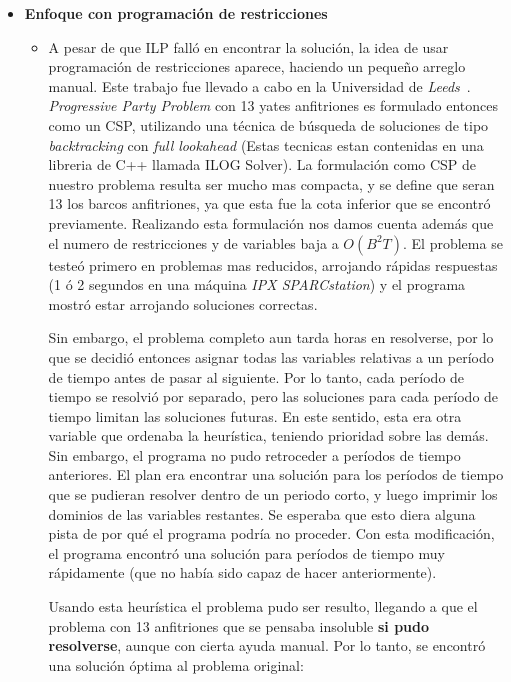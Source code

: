 \documentclass[letter, 10pt]{article}
\begin{document}
\begin{itemize}
\item \textbf{Enfoque con programación de restricciones}
\begin{itemize}
\item A pesar de que ILP falló en encontrar la solución, la idea de usar programación de restricciones aparece, haciendo un pequeño arreglo manual. Este trabajo fue llevado a cabo en la Universidad de \textit{Leeds}~\cite{Smith1996}. \textit{Progressive Party Problem} con 13 yates anfitriones es formulado entonces como un CSP, utilizando una técnica de búsqueda de soluciones de tipo \textit{backtracking} con \textit{full lookahead} (Estas tecnicas estan contenidas en una libreria de C++ llamada ILOG Solver).
La formulación como CSP de nuestro problema resulta ser mucho mas compacta, y se define que seran 13 los barcos anfitriones, ya que esta fue la cota inferior que se encontró previamente. Realizando esta formulación nos damos cuenta además que el numero de restricciones y de variables baja a $O(B^2T)$. El problema se testeó primero en problemas mas reducidos, arrojando rápidas respuestas (1 ó 2 segundos en una máquina \textit{IPX SPARCstation}) y el programa mostró estar arrojando soluciones correctas.

Sin embargo, el problema completo aun  tarda horas en resolverse, por lo que se decidió entonces asignar todas las variables relativas a un período de tiempo antes de pasar al siguiente. Por lo tanto, cada período de tiempo se resolvió por separado, pero las soluciones para cada período de tiempo limitan las soluciones futuras. En este sentido, esta era otra variable que ordenaba la heurística, teniendo prioridad sobre las demás. Sin embargo, el programa no pudo retroceder a períodos de tiempo anteriores. El plan era encontrar una solución para los períodos de tiempo que se pudieran resolver dentro de un periodo corto, y luego imprimir los dominios de las variables restantes. Se esperaba que esto diera alguna pista de por qué el programa podría no proceder. Con esta modificación, el programa encontró una solución para períodos de tiempo muy rápidamente (que no había sido capaz de hacer anteriormente).

Usando esta heurística el problema pudo ser resulto, llegando a que el problema con 13 anfitriones que se pensaba insoluble \textbf{si pudo resolverse}, aunque con cierta ayuda manual. Por lo tanto, se encontró una solución óptima al problema original:


\end{itemize}
\end{itemize}
\end{document}
